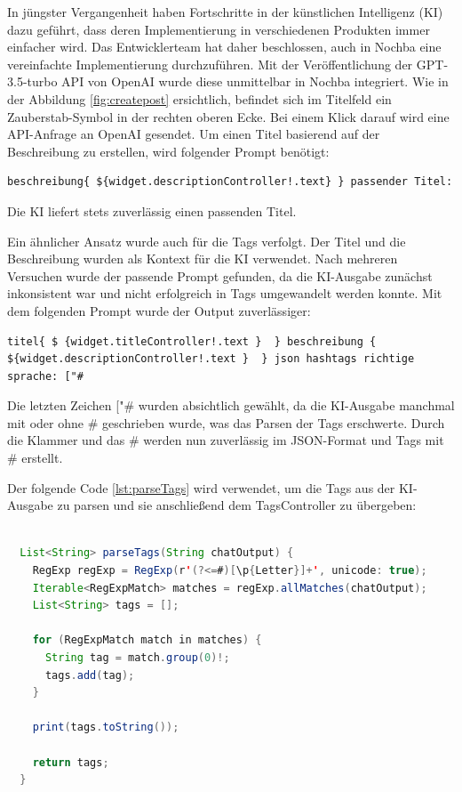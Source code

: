 In jüngster Vergangenheit haben Fortschritte in der künstlichen Intelligenz (KI) dazu geführt, dass deren Implementierung in verschiedenen Produkten immer einfacher wird. Das Entwicklerteam hat daher beschlossen, auch in Nochba eine vereinfachte Implementierung durchzuführen. Mit der Veröffentlichung der GPT-3.5-turbo API von OpenAI wurde diese unmittelbar in Nochba integriert. Wie in der Abbildung \ref{fig:createpost} ersichtlich, befindet sich im Titelfeld ein Zauberstab-Symbol in der rechten oberen Ecke. Bei einem Klick darauf wird eine API-Anfrage an OpenAI gesendet. Um einen Titel basierend auf der Beschreibung zu erstellen, wird folgender Prompt benötigt:
\begin{verbatim}
beschreibung{ ${widget.descriptionController!.text} } passender Titel:
\end{verbatim}

Die KI liefert stets zuverlässig einen passenden Titel.

Ein ähnlicher Ansatz wurde auch für die Tags verfolgt. Der Titel und die Beschreibung wurden als Kontext für die KI verwendet. Nach mehreren Versuchen wurde der passende Prompt gefunden, da die KI-Ausgabe zunächst inkonsistent war und nicht erfolgreich in Tags umgewandelt werden konnte. Mit dem folgenden Prompt wurde der Output zuverlässiger:

\begin{verbatim}
titel{ $ {widget.titleController!.text }  } beschreibung { ${widget.descriptionController!.text }  } json hashtags richtige sprache: ["#
\end{verbatim}


Die letzten Zeichen ["\# wurden absichtlich gewählt, da die
KI-Ausgabe manchmal mit oder ohne \# geschrieben wurde, was
das Parsen der Tags erschwerte. Durch die Klammer und das \#
werden nun zuverlässig im JSON-Format und Tags mit \#
erstellt.

Der folgende Code \ref{lst:parseTags} wird verwendet, um die Tags aus der KI-Ausgabe zu parsen und sie anschließend dem TagsController zu übergeben:

\begin{lstlisting}[language=Java,caption=parseTags von 
  KI output,label=lst:parseTags]  
  
  List<String> parseTags(String chatOutput) {
    RegExp regExp = RegExp(r'(?<=#)[\p{Letter}]+', unicode: true);
    Iterable<RegExpMatch> matches = regExp.allMatches(chatOutput);
    List<String> tags = [];

    for (RegExpMatch match in matches) {
      String tag = match.group(0)!;
      tags.add(tag);
    }

    print(tags.toString());

    return tags;
  }
    
\end{lstlisting}




